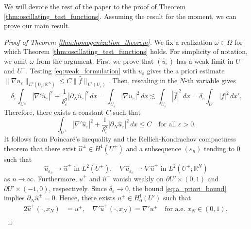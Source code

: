 \documentclass{article}
\numberwithin{equation}{section}
\theoremstyle{definition}
\theoremstyle{remark}
\begin{document}
We will devote the rest of the paper to the proof of Theorem \ref{thm:oscillating_test_functions}. Assuming the result for the moment, we can prove our main result.

\begin{proof}[Proof of Theorem \ref{thm:homogenization_theorem}]
    We fix a realization $\omega \in \Omega$ for which Theorem \ref{thm:oscillating_test_functions} holds. For simplicity of notation, we omit $\omega$ from the argument. First we prove that $(\hat{u}_\varepsilon)$ has a weak limit in $U^+$ and $U^-$. Testing \eqref{eq:weak_formulation} with $u_\varepsilon$ gives the a priori estimate $\|\nabla u_\varepsilon\|_{L^2(U_\varepsilon; \mathbb{R}^{N})} \le C \|\hat{f}\|_{L^2(U_\varepsilon)}$. Then, rescaling in the $N$-th variable gives
    \begin{equation*}
            \delta_\varepsilon \int_{U^\pm} |\nabla' \hat{u}_\varepsilon|^2 + \frac{1}{\delta_\varepsilon^2}|\partial_N \hat{u}_\varepsilon|^2 \, dx = \int_{U_\varepsilon} |\nabla u_\varepsilon|^2 \, dx \lesssim \int_{U_\varepsilon} |\hat{f}|^2 \, dx = \delta_\varepsilon \int_{U'} |f|^2 \, dx'.
    \end{equation*}
    Therefore, there exists a constant $C$ such that
    \begin{equation} \label{eq:a_priori_bound}
            \int_{U^\pm} |\nabla' \hat{u}_\varepsilon|^2 + \frac{1}{\delta_\varepsilon^2}|\partial_N \hat{u}_\varepsilon|^2 \, dx \le C \quad \text{for all } \varepsilon > 0.
    \end{equation}
    It follows from Poincaré's inequality and the Rellich-Kondrachov compactness theorem that there exist $\hat{u}^\pm \in H^1(U^\pm)$ and a subsequence $(\varepsilon_n)$ tending to $0$ such that
    \begin{equation} \label{eq:existence_of_limit}
            \hat{u}_{\varepsilon_n} \to \hat{u}^\pm \text{ in } L^2(U^\pm), \quad \nabla \hat{u}_{\varepsilon_n} \rightharpoonup \nabla \hat{u}^\pm \text{ in } L^2(U^\pm; \mathbb{R}^N)
    \end{equation}
    as $n \to \infty$. Furthermore, $\hat{u}^+$ and $\hat{u}^-$ vanish weakly on $\partial U' \times (0, 1)$ and $\partial U' \times (-1, 0)$, respectively. Since $\delta_\varepsilon \to 0$, the bound \eqref{eq:a_priori_bound} implies $\partial_N \hat{u}^\pm = 0$. Hence, there exists $u^\pm \in H_0^1(U')$ such that
    \begin{alignat*}{2}
        \hat{u}^+(\cdot, x_N) &= u^+, \quad \nabla' \hat{u}^+(\cdot, x_N) = \nabla' u^+ \quad \text{for a.e. } x_N \in (0, 1), \\ \label{eq:cross_section_function_2}

\end{alignat*}
\end{proof}
\end{document}
